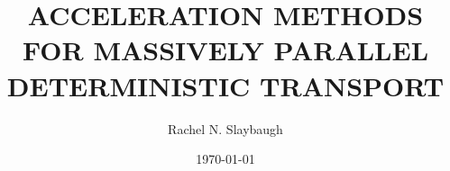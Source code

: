 

\clearpage{}  %



\title{ACCELERATION METHODS FOR MASSIVELY PARALLEL DETERMINISTIC TRANSPORT}
\author{Rachel N. Slaybaugh}
\date{\today}
\disseration
\maketitle

\copyrightpage


